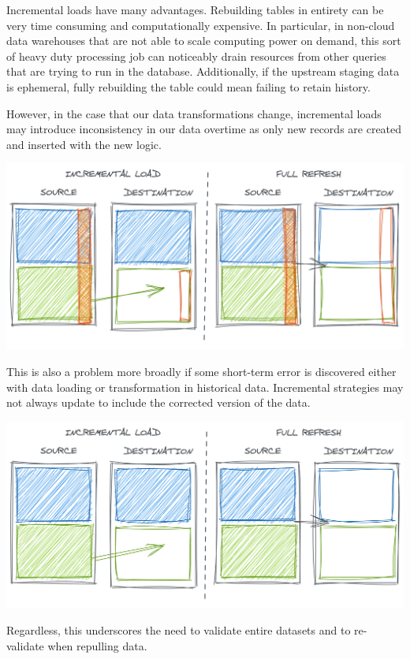 \documentclass[
]{krantz}
\begin{document}
Incremental loads have many advantages. Rebuilding tables in entirety can be very time consuming and computationally expensive. In particular, in non-cloud data warehouses that are not able to scale computing power on demand, this sort of heavy duty processing job can noticeably drain resources from other queries that are trying to run in the database. Additionally, if the upstream staging data is ephemeral, fully rebuilding the table could mean failing to retain history.

However, in the case that our data transformations change, incremental loads may introduce inconsistency in our data overtime as only new records are created and inserted with the new logic.

\begin{center}\includegraphics[width=0.9\linewidth]{figures/data-dall/incr-full-bad-col} \end{center}

This is also a problem more broadly if some short-term error is discovered either with data loading or transformation in historical data. Incremental strategies may not always update to include the corrected version of the data.

\begin{center}\includegraphics[width=0.9\linewidth]{figures/data-dall/incr-full-good} \end{center}

Regardless, this underscores the need to validate entire datasets and to re-validate when repulling data.
\end{document}
